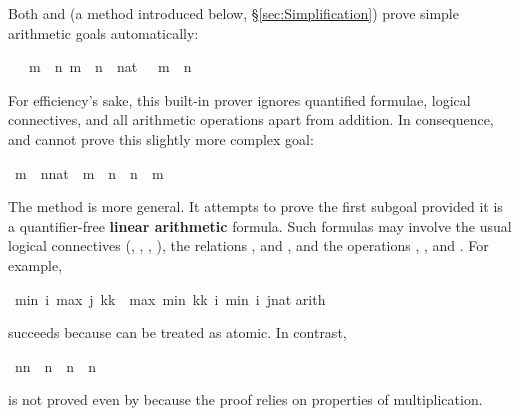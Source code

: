 \begin{isabellebody}
\begin{isamarkuptext}
Both  and 
(a method introduced below, \S\ref{sec:Simplification}) prove 
simple arithmetic goals automatically:%
\end{isamarkuptext}%
\isamarkuptrue%
\ {\isachardoublequote}{\isasymlbrakk}\ {\isasymnot}\ m\ {\isacharless}\ n{\isacharsemicolon}\ m\ {\isacharless}\ n\ {\isacharplus}\ {\isacharparenleft}{}{\isacharcolon}{\isacharcolon}nat{\isacharparenright}\ {\isasymrbrakk}\ {\isasymLongrightarrow}\ m\ {\isacharequal}\ n{\isachardoublequote}\isamarkupfalse%
\isamarkupfalse%
%
\begin{isamarkuptext}%
\noindent
For efficiency's sake, this built-in prover ignores quantified formulae,
logical connectives, and all arithmetic operations apart from addition.
In consequence,  and  cannot prove this slightly more complex goal:%
\end{isamarkuptext}%
\isamarkuptrue%
\ {\isachardoublequote}m\ {\isasymnoteq}\ {\isacharparenleft}n{\isacharcolon}{\isacharcolon}nat{\isacharparenright}\ {\isasymLongrightarrow}\ m\ {\isacharless}\ n\ {\isasymor}\ n\ {\isacharless}\ m{\isachardoublequote}\isamarkupfalse%
\isamarkupfalse%
%
\begin{isamarkuptext}%
\noindent
The method  is more general.  It attempts to prove
the first subgoal provided it is a quantifier-free \textbf{linear arithmetic}
formula.  Such formulas may involve the
usual logical connectives (\isa{{\isasymnot}}, \isa{{\isasymand}}, \isa{{\isasymor}},
\isa{{\isasymlongrightarrow}}), the relations \isa{{\isacharequal}}, \isa{{\isasymle}} and \isa{{\isacharless}},
and the operations
\isa{{\isacharplus}}, \isa{{\isacharminus}},  and . 
For example,%
\end{isamarkuptext}%
\isamarkuptrue%
\ {\isachardoublequote}min\ i\ {\isacharparenleft}max\ j\ {\isacharparenleft}k{\isacharasterisk}k{\isacharparenright}{\isacharparenright}\ {\isacharequal}\ max\ {\isacharparenleft}min\ {\isacharparenleft}k{\isacharasterisk}k{\isacharparenright}\ i{\isacharparenright}\ {\isacharparenleft}min\ i\ {\isacharparenleft}j{\isacharcolon}{\isacharcolon}nat{\isacharparenright}{\isacharparenright}{\isachardoublequote}\isanewline
\isamarkupfalse%
arith{\isacharparenright}\isamarkupfalse%
\isamarkupfalse%
%
\begin{isamarkuptext}%
\noindent
succeeds because  can be treated as atomic. In contrast,%
\end{isamarkuptext}%
\isamarkuptrue%
\ {\isachardoublequote}n{\isacharasterisk}n\ {\isacharequal}\ n\ {\isasymLongrightarrow}\ n{\isacharequal}{}\ {\isasymor}\ n{\isacharequal}{}{\isachardoublequote}\isamarkupfalse%
\isamarkupfalse%
%
\begin{isamarkuptext}%
\noindent
is not proved even by  because the proof relies 
on properties of multiplication.


\end{isamarkuptext}
\end{isabellebody}
